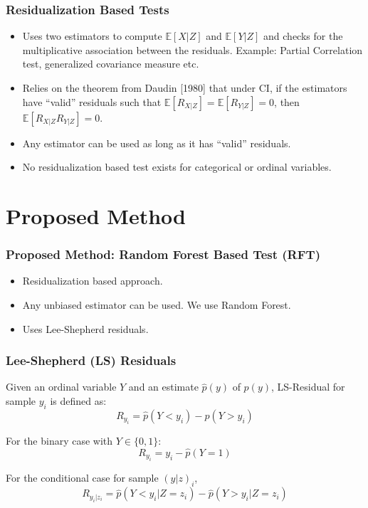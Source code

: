 \documentclass{beamer}
\begin{document}
\begin{frame}
	\frametitle{Residualization Based Tests}
	\begin{itemize}
		\setlength\itemsep{1em}
		\item Uses two estimators to compute $ \mathbb{E}[X| Z] $ and $
			\mathbb{E}[Y | Z] $ and checks for the multiplicative
			association between the residuals. Example:
			Partial Correlation test, generalized covariance measure etc.
		\item Relies on the theorem from Daudin [1980] \footnotemark 
			that under CI, if the estimators have ``valid'' residuals
			such that $ \mathbb{E}[R_{X|Z}] = \mathbb{E}[R_{Y|Z}] = 0 $,
			then $ \mathbb{E}[R_{X|Z} R_{Y|Z}] = 0 $.
		\item Any estimator can be used as long as it has ``valid'' residuals.
		\item No residualization based test exists for categorical or ordinal variables.
	\end{itemize}
\end{frame}

\section{Proposed Method}
\begin{frame}
	\frametitle{Proposed Method: Random Forest Based Test (RFT)}
	\begin{itemize}
		\setlength\itemsep{1em}
		\item Residualization based approach.
		\item Any unbiased estimator can be used. We use Random Forest.
		\item Uses Lee-Shepherd residuals.
	\end{itemize}
\end{frame}

\begin{frame}
	\frametitle{Lee-Shepherd (LS) Residuals}
	Given an ordinal variable $ Y $ and an estimate $ \hat{p}(y) $ of $
	p(y) $, LS-Residual for sample $ y_i $ is defined as:
	$$ R_{y_i} = \hat{p}(Y < y_i) - \hat{p}(Y > y_i) $$
	\vspace{1em}

	For the binary case with $ Y \in \{0, 1\} $:
	$$ R_{y_i} = y_i - \hat{p}(Y = 1) $$
	\vspace{1em}

	For the conditional case for sample $ (y|z)_i $,
	$$ R_{y_i | z_i} = \hat{p}(Y < y_i | Z=z_i) - \hat{p}(Y>y_i|Z=z_i) $$
\end{frame}
\end{document}

